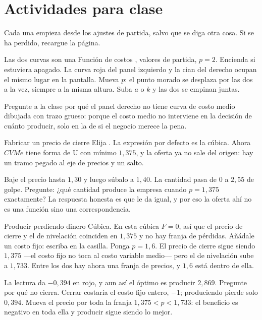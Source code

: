 \documentclass[11pt,a4paper]{appletmanual}
\begin{document}

\section{Actividades para clase}

Cada una empieza desde los ajustes de partida, salvo que se diga otra cosa. Si
se ha perdido, recargue la página.

\begin{activity}{Las dos curvas son una}
\amset Función de costos , valores de partida,
$p = 2$. Encienda  si estuviera apagado.
\amexp La curva roja del panel izquierdo y la cian del derecho ocupan el mismo
lugar en la pantalla. Mueva $p$: el punto morado se desplaza por las dos a la
vez, siempre a la misma altura. Suba $a$ o $k$ y las dos se empinan juntas.
\par\smallskip
Pregunte a la clase por qué el panel derecho no tiene curva de costo medio
dibujada con trazo grueso: porque el costo medio no interviene en la decisión
de cuánto producir, solo en la de si el negocio merece la pena.
\end{activity}

\begin{activity}{Fabricar un precio de cierre}
\amset Elija . La expresión por defecto es la cúbica.
\amexp Ahora $CVMe$ tiene forma de U con mínimo $1{,}375$, y la oferta ya no
sale del origen: hay un tramo pegado al eje de precios y un salto.
\par\smallskip
Baje el precio hasta $1{,}30$ y luego súbalo a $1{,}40$. La cantidad pasa de $0$
a $2{,}55$ de golpe. Pregunte: ¿qué cantidad produce la empresa cuando
$p = 1{,}375$ exactamente? La respuesta honesta es que le da igual, y por eso
la oferta ahí no es una función sino una correspondencia.
\end{activity}

\begin{activity}{Producir perdiendo dinero}
\amset Cúbica. En esta cúbica $F = 0$, así que el precio de cierre y el de
nivelación coinciden en $1{,}375$ y no hay franja de pérdidas. Añádale un costo
fijo: escriba  en la casilla. Ponga $p = 1{,}6$.
\amexp El precio de cierre sigue siendo $1{,}375$ —el costo fijo no toca al
costo variable medio— pero el de nivelación sube a $1{,}733$. Entre los dos hay
ahora una franja de precios, y $1{,}6$ está dentro de ella.
\par\smallskip
La lectura  da $-0{,}394$ en rojo, y aun así el óptimo es producir
$2{,}869$. Pregunte por qué no cierra. Cerrar costaría el costo fijo entero,
$-1$; produciendo pierde solo $0{,}394$. Mueva el precio por toda la franja
$1{,}375 < p < 1{,}733$: el beneficio es negativo en toda ella y producir sigue
siendo lo mejor.
\end{activity}
\end{document}

